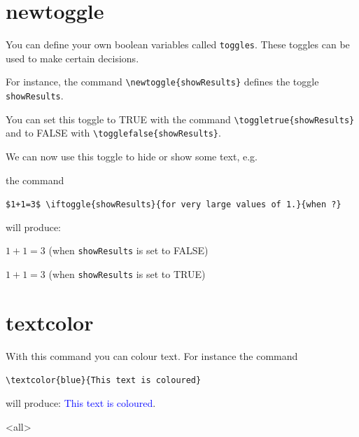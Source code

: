 \section{newtoggle}

You can define your own boolean variables called \verb|toggles|. These toggles can be used to make certain decisions.

For instance, the command \verb|\newtoggle{showResults}| defines the toggle \verb|showResults|.

You can set this toggle to TRUE with the command \verb|\toggletrue{showResults}| and to FALSE with \verb|\togglefalse{showResults}|.

We can now use this toggle to hide or show some text, e.g.

the command

\verb|$1+1=3$ \iftoggle{showResults}{for very large values of 1.}{when ?}|

will produce:

\togglefalse{showResults}
$1+1 = 3$ \iftoggle{showResults}{for very large values of 1.}{when ?} (when \verb|showResults| is set to FALSE)

\toggletrue{showResults}
$1+1 = 3$ \iftoggle{showResults}{for very large values of 1.}{when ?} (when \verb|showResults| is set to TRUE)

\section{textcolor}
With this command you can colour text. For instance the command

\verb|\textcolor{blue}{This text is coloured}|

will produce: \textcolor{blue}{This text is coloured}.


\mode<all> 

